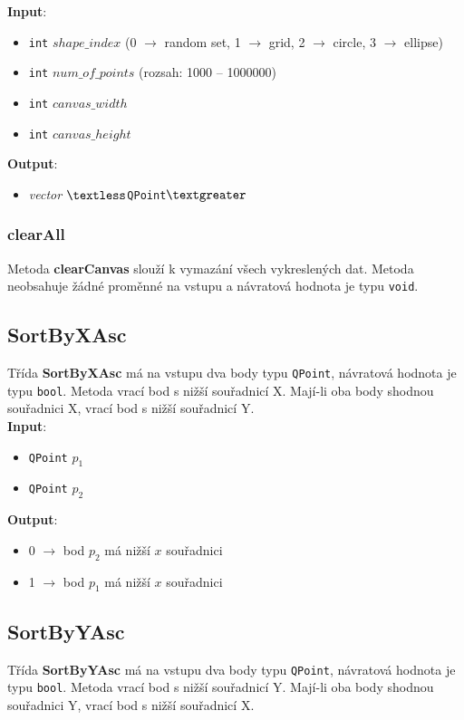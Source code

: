 \documentclass[a4paper, 12pt]{article}
\begin{document}
\textbf{Input}:
\begin{itemize}
\item \texttt{int} $shape\_index$ (0 $\rightarrow$ random set, 1 $\rightarrow$ grid, 2 $\rightarrow$ circle, 3 $\rightarrow$ ellipse)
\item \texttt{int} $num\_of\_points$ (rozsah: 1000 – 1000000)
\item \texttt{int} $canvas\_width$
\item \texttt{int} $canvas\_height$
\end{itemize}

\textbf{Output}:
\begin{itemize}
\item \textsl{vector} $\textless$\texttt{QPoint}$\textgreater$
\end{itemize}

\subsubsection*{clearAll}
Metoda \textbf{clearCanvas} slouží k vymazání všech vykreslených dat. Metoda neobsahuje žádné proměnné na vstupu a návratová hodnota je typu \texttt{void}.

\subsection{SortByXAsc}
Třída \textbf{SortByXAsc} má na vstupu dva body typu \texttt{QPoint}, návratová hodnota je typu \texttt{bool}. Metoda vrací bod s nižší  souřadnicí X. Mají-li oba body shodnou souřadnici X, vrací bod s nižší souřadnicí Y.\\

\textbf{Input}:
\begin{itemize}
\item \texttt{QPoint} $p_1$
\item \texttt{QPoint} $p_2$
\end{itemize}

\textbf{Output}:
\begin{itemize}
\item 0 $\rightarrow$ bod $p_2$ má nižší $x$ souřadnici
\item 1 $\rightarrow$ bod $p_1$ má nižší $x$ souřadnici
\end{itemize}

\subsection{SortByYAsc}
Třída \textbf{SortByYAsc} má na vstupu dva body typu \texttt{QPoint}, návratová hodnota je typu \texttt{bool}. Metoda vrací bod s nižší  souřadnicí Y. Mají-li oba body shodnou souřadnici Y, vrací bod s nižší souřadnicí X.\\
\end{document}
